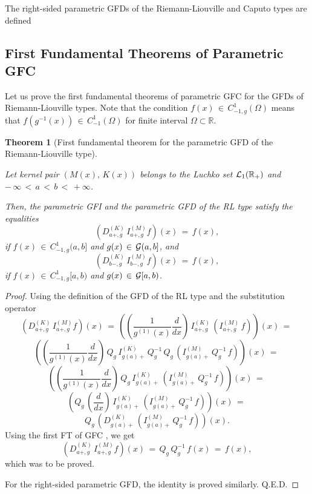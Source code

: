 \documentclass[12pt]{article}
\newtheorem{Theorem}{Theorem}
\begin{document}
The right-sided parametric GFDs of the Riemann-Liouville and Caputo types are defined 


\subsection{First Fundamental Theorems of Parametric GFC}


Let us prove the first fundamental theorems of parametric GFC for the GFDs of Riemann-Liouville types.
Note that the condition 
$f(x) \, \in \, C^{1}_{-1,g}(\Omega)$ 
means that
$f(g^{-1}(x)) \, \in \, C^{1}_{-1}(\Omega)$
for finite interval $\Omega \subset \mathbb{R}$. 


\begin{Theorem}[First fundamental theorem for the parametric GFD of the Riemann-Liouville type]
\label{FT-1-RL} 

Let kernel pair $(M(x), \, K(x))$ belongs to the Luchko set ${\cal L}_{1}(\mathbb{R}_{+})$ and
$ - \, \infty \, < \, a \, < \, b \, < \, +\infty$.

Then, the parametric GFI and the parametric GFD of the RL type satisfy the equalities
\[
(D^{(K)}_{a+,g} \, I^{(M)}_{a+,g} f)(x) \, = \, f(x) ,
\]
if $f(x) \, \in \, C^{1}_{-1,g}(a,b]$ 
and $g(x) \, \in \, {\cal G}(a,b]$, and 
\[
(D^{(K)}_{b-,g} \, I^{(M)}_{b-,g} f)(x) \, = \, f(x) ,
\]
if $f(x) \, \in \, C^{1}_{-1,g}[a,b)$ 
and $g(x) \, \in \, {\cal G}[a,b)$.
\end{Theorem}

\begin{proof}
Using the definition of the GFD of the RL type and the substitution operator
\[
(D^{(K)}_{a+,g} \, I^{(M)}_{a+,g} f)(x) \, = \, 
\left( \left(\frac{1}{g^{(1)}(x)} \frac{d}{dx} \right) \, 
I^{(K)}_{a+,g} \,
\left( I^{(M)}_{a+,g} \,f \right) \right)(x) \, = \, 
\]
\[
\left( \left(\frac{1}{g^{(1)}(x)} \frac{d}{dx} \right)
\, Q_g \, I^{(K)}_{g(a)+} \, Q^{-1}_g \, Q_g \, 
\left( I^{(M)}_{g(a)+} \, Q^{-1}_g \, f \right) \right)(x) 
\, = \, 
\]
\[
\left( \left(\frac{1}{g^{(1)}(x)} \frac{d}{dx} \right) 
\, Q_g \,I^{(K)}_{g(a)+} \,
\left( I^{(M)}_{g(a)+} \, Q^{-1}_g \, f \right) \right)(x) 
\, = \, 
\]
\[
\left( 
Q_g \, \left(\frac{d}{dx} \right) \, I^{(K)}_{g(a)+} \, 
\left( I^{(M)}_{g(a)+} \, Q^{-1}_g \, f \right) \right)(x) 
\, = \, 
\]
\[
Q_g \, \left( D^{(K)}_{g(a)+} \, 
\left( I^{(M)}_{g(a)+} \, Q^{-1}_g \, f \right) \right)(x) .
\]
Using the first FT of GFC \cite{Luchko2023}, we get
\[
(D^{(K)}_{a+,g} \, I^{(M)}_{a+,g} f)(x) \, = \, 
Q_g \, Q^{-1}_g \, f(x) \, = \, f(x) ,
\]
which was to be proved. 

For the right-sided parametric GFD, the identity is proved similarly.
Q.E.D.
\end{proof}
\end{document}

